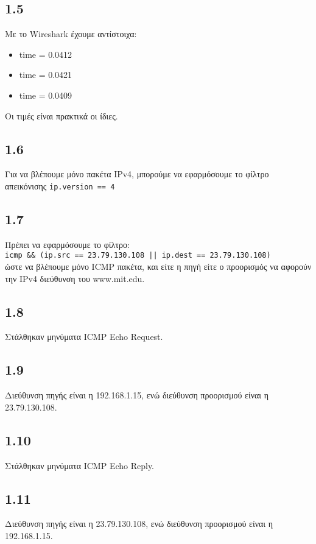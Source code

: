 		\subsection*{1.5}
			Mε το Wireshark έχουμε αντίστοιχα:
			\begin{itemize}
				\item time = 0.0412
				\item time = 0.0421
				\item time = 0.0409
			\end{itemize}
			
			Οι τιμές είναι πρακτικά οι ίδιες.

		\subsection*{1.6}
			Για να βλέπουμε μόνο πακέτα IPv4, μπορούμε να εφαρμόσουμε το φίλτρο απεικόνισης \verb|ip.version == 4|

		\subsection*{1.7}
			Πρέπει να εφαρμόσουμε το φίλτρο: \\
			\verb+icmp && (ip.src == 23.79.130.108 || ip.dest == 23.79.130.108)+ \\
			ώστε να βλέπουμε μόνο ICMP πακέτα, και είτε η πηγή είτε ο προορισμός να αφορούν την IPv4 διεύθυνση του www.mit.edu. 

		\subsection*{1.8} 
			Στάλθηκαν μηνύματα ICMP Echo Request.

		\subsection*{1.9}
			Διεύθυνση πηγής είναι η 192.168.1.15, ενώ διεύθυνση προορισμού είναι η 23.79.130.108.

		\subsection*{1.10}
			Στάλθηκαν μηνύματα ICMP Echo Reply.

		\subsection*{1.11}
			Διεύθυνση πηγής είναι η 23.79.130.108, ενώ διεύθυνση προορισμού είναι η 192.168.1.15.
			
